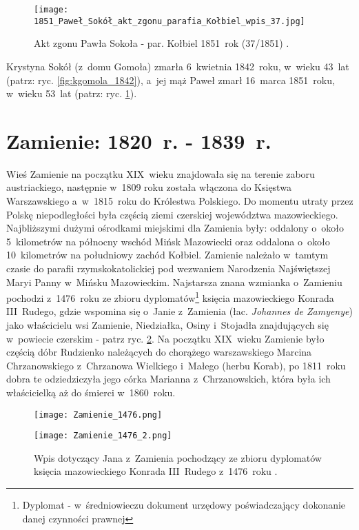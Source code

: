   \begin{figure}[!ht]
    \vspace*{0.5cm}
    \centering \texttt{[image: 
        1851\_Paweł\_Sokół\_akt\_zgonu\_parafia\_Kołbiel\_wpis\_37.jpg]}
    \captionsetup{format=hang}
    \caption{Akt zgonu Pawła Sokoła - par. Kołbiel 1851~rok (37/1851) 
    \cite{par_kolbiel1}.}
    \label{fig:psokol_1851}
\end{figure}

Krystyna Sokół (z~domu Gomoła) zmarła 6~kwietnia 1842~roku, w~wieku 43~lat 
(patrz: ryc. \ref{fig:kgomola_1842}), a~jej mąż Paweł zmarł 16~marca 
1851~roku, w~wieku 53~lat (patrz: ryc. \ref{fig:psokol_1851}).

\clearpage


\section{Zamienie: 1820~r. - 1839~r.}

Wieś Zamienie na początku XIX~wieku znajdowała się na terenie zaboru 
austriackiego, następnie w~1809 roku została włączona do Księstwa 
Warszawskiego a~w~1815~roku do Królestwa Polskiego. Do momentu utraty przez 
Polskę niepodległości była częścią ziemi czerskiej województwa mazowieckiego. 
Najbliższymi dużymi ośrodkami miejskimi dla Zamienia były: oddalony o~około 
5~kilometrów na północny wschód Mińsk Mazowiecki oraz oddalona o~około 
10~kilometrów na południowy zachód Kołbiel. Zamienie należało w~tamtym czasie 
do parafii rzymskokatolickiej pod wezwaniem Narodzenia Najświętszej Maryi 
Panny w~Mińsku Mazowieckim. Najstarsza znana wzmianka o~Zamieniu pochodzi 
z~1476~roku ze zbioru dyplomatów\footnote{Dyplomat - w~średniowieczu dokument 
urzędowy poświadczający dokonanie danej czynności prawnej} księcia 
mazowieckiego Konrada III~Rudego, gdzie wspomina się o~Janie z~Zamienia (łac. 
\emph{Johannes de Zamyenye}) jako właścicielu wsi Zamienie, Niedziałka, Osiny 
i~Stojadła znajdujących się w~powiecie czerskim - patrz ryc. 
\ref{fig:zamienie_1476}. Na początku XIX~wieku Zamienie było częścią dóbr 
Rudzienko należących do chorążego warszawskiego Marcina Chrzanowskiego 
z~Chrzanowa Wielkiego i~Małego (herbu Korab), po 1811~roku dobra te 
odziedziczyła jego córka Marianna z~Chrzanowskich, która była ich 
właścicielką aż do śmierci w~1860~roku.

\begin{figure}[!ht]
    \vspace*{0.5cm}
    \centering \texttt{[image: Zamienie\_1476.png]}

    \vspace*{0.5cm}

    \centering \texttt{[image: Zamienie\_1476\_2.png]}
    \captionsetup{format=hang}
    \caption{Wpis dotyczący Jana z~Zamienia pochodzący ze zbioru dyplomatów 
    księcia mazowieckiego Konrada III~Rudego z~1476~roku \cite{jlubomirski2}.}
    \label{fig:zamienie_1476}
\end{figure}

